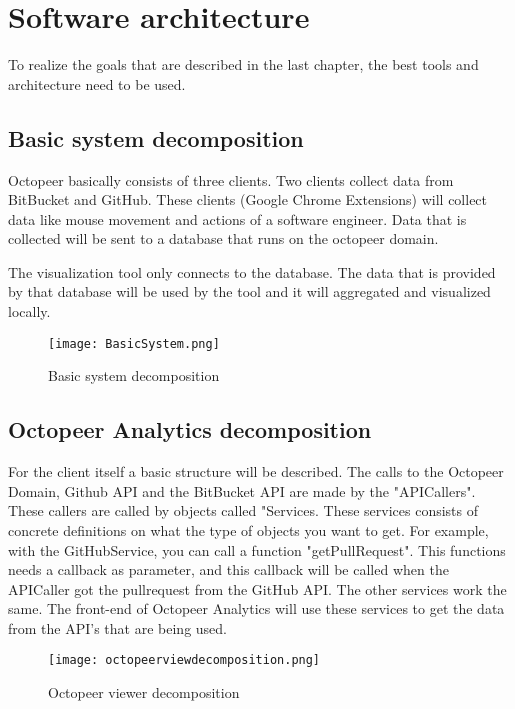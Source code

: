 \documentclass{article}
\begin{document}
\section{Software architecture}

To realize the goals that are described in the last chapter, the best tools and architecture need to be used.

\subsection{Basic system decomposition}

Octopeer basically consists of three clients. Two clients collect data from BitBucket and GitHub. These clients (Google Chrome Extensions) will collect data like mouse movement and actions of a software engineer. Data that is collected will be sent to a database that runs on the octopeer domain.

The visualization tool only connects to the database. The data that is provided by that database will be used by the tool and it will aggregated and visualized locally.

\begin{figure}[htp]
\centering
\texttt{[image: BasicSystem.png]}
\caption{Basic system decomposition}
\end{figure}

\subsection{Octopeer Analytics decomposition}

For the client itself a basic structure will be described. The calls to the Octopeer Domain, Github API and the BitBucket API are made by the "APICallers". These callers are called by objects called "Services. These services consists of concrete definitions on what the type of objects you want to get. For example, with the GitHubService, you can call a function "getPullRequest". This functions needs a callback as parameter, and this callback will be called when the APICaller got the pullrequest from the GitHub API. The other services work the same. The front-end of Octopeer Analytics will use these services to get the data from the API's that are being used.

\begin{figure}[htp]
\centering
\texttt{[image: octopeerviewdecomposition.png]}
\caption{Octopeer viewer decomposition}
\end{figure}
\end{document}
